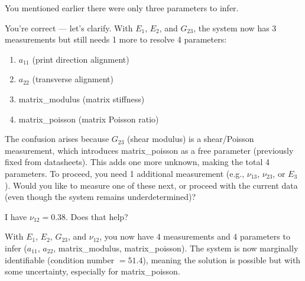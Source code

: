 \documentclass[preprint,review,10pt,number]{elsarticle}
\begin{document}
\begin{center}
\begin{tcolorbox}
\vspace{8pt}
\begin{tcolorbox}[
    breakable,
    colback=gray!8, colframe=gray!60, boxrule=0.5pt, arc=2pt,
    left=6pt, right=6pt, top=4pt, bottom=4pt,
    title={\textbf{User}}, fonttitle=\small\bfseries, coltitle=black
]
\small
You mentioned earlier there were only three parameters to infer.
\end{tcolorbox}
\vspace{4pt}
\begin{tcolorbox}[
    breakable,
    colback=gray!3, colframe=gray!40, boxrule=0.5pt, arc=2pt,
    left=6pt, right=6pt, top=4pt, bottom=4pt,
    title={\textbf{\texttt{MateriAl}}}, fonttitle=\small\bfseries, coltitle=black
]
\small
You're correct --- let's clarify. With $E_1$, $E_2$, and $G_{23}$, the system now has 3 measurements but still needs 1 more to resolve 4 parameters:
\begin{enumerate}[leftmargin=1.4em, itemsep=1pt, topsep=2pt]
\item $a_{11}$ (print direction alignment)
\item $a_{22}$ (transverse alignment)
\item matrix\_modulus (matrix stiffness)
\item matrix\_poisson (matrix Poisson ratio)
\end{enumerate}
The confusion arises because $G_{23}$ (shear modulus) is a shear/Poisson measurement, which introduces matrix\_poisson as a free parameter (previously fixed from datasheets). This adds one more unknown, making the total 4 parameters. To proceed, you need 1 additional measurement (e.g., $\nu_{13}$, $\nu_{23}$, or $E_3$). Would you like to measure one of these next, or proceed with the current data (even though the system remains underdetermined)?
\end{tcolorbox}

\vspace{8pt}
\begin{tcolorbox}[
    breakable,
    colback=gray!8, colframe=gray!60, boxrule=0.5pt, arc=2pt,
    left=6pt, right=6pt, top=4pt, bottom=4pt,
    title={\textbf{User}}, fonttitle=\small\bfseries, coltitle=black
]
\small
I have $\nu_{12} = 0.38$. Does that help?
\end{tcolorbox}
\vspace{4pt}
\begin{tcolorbox}[
    breakable,
    colback=gray!3, colframe=gray!40, boxrule=0.5pt, arc=2pt,
    left=6pt, right=6pt, top=4pt, bottom=4pt,
    title={\textbf{\texttt{MateriAl}}}, fonttitle=\small\bfseries, coltitle=black
]
\small
With $E_1$, $E_2$, $G_{23}$, and $\nu_{12}$, you now have 4 measurements and 4 parameters to infer ($a_{11}$, $a_{22}$, matrix\_modulus, matrix\_poisson). The system is now marginally identifiable (condition number $= 51.4$), meaning the solution is possible but with some uncertainty, especially for matrix\_poisson.
\vspace{4pt}


\end{tcolorbox}
\end{tcolorbox}
\end{center}
\end{document}
